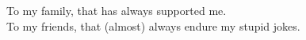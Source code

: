 \cleardoublepage

\mbox{}\vfill

\begin{minipage}{5.3in}
\begin{flushright}
\begin{flushright}
\begin{em}
To my family, that has always supported me.\\
To my friends, that (almost) always endure my stupid jokes.
\end{em}
\end{flushright}
\end{flushright}
\end{minipage}
\mbox{}\vfill